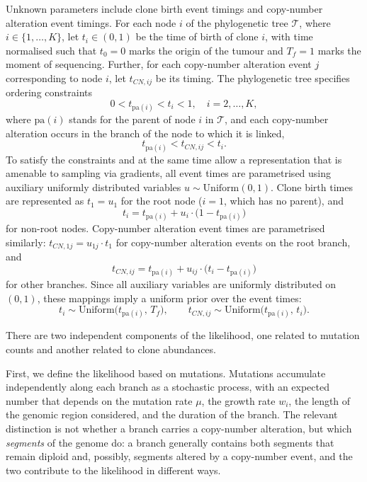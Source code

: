 Unknown parameters include clone birth event timings and copy-number alteration
event timings. For each node $i$ of the phylogenetic tree $\mathcal{T}$, where 
$i \in \{1, \ldots, K\}$, let $t_i \in (0, 1)$ be the time of birth of clone $i$, 
with time normalised such that $t_0 = 0$ marks the origin of the tumour and 
$T_f = 1$ marks the moment of sequencing. Further, for each copy-number alteration 
event $j$ corresponding to node $i$, let $t_{CN,ij}$ be its timing. The 
phylogenetic tree specifies ordering constraints
%
\begin{equation}
    0 < t_{\mathrm{pa}(i)} < t_i < 1, \quad i = 2, \ldots, K,
\end{equation}
%
where $\mathrm{pa}(i)$ stands for the parent of node $i$ in $\mathcal{T}$, 
and each copy-number alteration occurs in the branch of the node to which it is 
linked,
%
\begin{equation}
    t_{\mathrm{pa}(i)} < t_{CN,ij} < t_i.
\end{equation}
%
To satisfy the constraints and at the same time allow a representation that is 
amenable to sampling via gradients, all event times are parametrised using 
auxiliary uniformly distributed variables $u \sim \mathrm{Uniform}(0, 1)$. Clone 
birth times are represented as $t_1 = u_1$ for the root node ($i = 1$, which has 
no parent), and
%
\begin{equation}
    t_i = t_{\mathrm{pa}(i)} + u_i \cdot \bigl(1 - t_{\mathrm{pa}(i)}\bigr)
\end{equation}
%
for non-root nodes. Copy-number alteration event times are parametrised similarly: 
$t_{CN,1j} = u_{1j} \cdot t_1$ for copy-number alteration events on the root 
branch, and
%
\begin{equation}
    t_{CN,ij} = t_{\mathrm{pa}(i)} + u_{ij} \cdot 
    \bigl(t_i - t_{\mathrm{pa}(i)}\bigr)
\end{equation}
%
for other branches. Since all auxiliary variables are uniformly distributed on 
$(0, 1)$, these mappings imply a uniform prior over the event times:
%
\begin{equation}
    t_i \sim \mathrm{Uniform}\bigl(t_{\mathrm{pa}(i)},\, T_f\bigr), \qquad
    t_{CN,ij} \sim \mathrm{Uniform}\bigl(t_{\mathrm{pa}(i)},\, t_i\bigr).
\end{equation}

There are two independent components of the likelihood, one related to mutation 
counts and another related to clone abundances.

First, we define the likelihood based on mutations. Mutations accumulate independently
along each branch as a stochastic process, with an expected number that depends on the
mutation rate $\mu$, the growth rate $w_i$, the length of the genomic region
considered, and the duration of the branch. The relevant distinction is not whether a
branch carries a copy-number alteration, but which \emph{segments} of the genome do: a
branch generally contains both segments that remain diploid and, possibly, segments
altered by a copy-number event, and the two contribute to the likelihood in different
ways.

